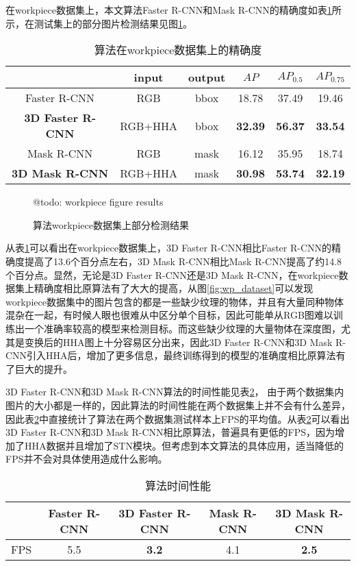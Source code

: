 在workpiece数据集上，本文算法Faster R-CNN和Mask R-CNN的精确度如表\ref{tab:ap2}所示，在测试集上的部分图片检测结果见图\ref{fig:wp_res}。
\begin{table}[ht]
  \centering
  \caption{算法在workpiece数据集上的精确度}
    \begin{tabular}{cccccc}
      \toprule
      &input&output&$AP$&$AP_{0.5}$&$AP_{0.75}$ \\
      \midrule
      Faster R-CNN&RGB&bbox&18.78&37.49&19.46 \\
      \bf{3D Faster R-CNN}&RGB+HHA&bbox&\bf{32.39}&\bf{56.37}&\bf{33.54} \\
      Mask R-CNN&RGB&mask&16.12&35.95&18.74 \\
      \bf{3D Mask R-CNN}&RGB+HHA&mask&\bf{30.98}&\bf{53.74}&\bf{32.19} \\
      \bottomrule
    \end{tabular}
  \label{tab:ap2}
\end{table}
\begin{figure}[ht]
  \centering
  @todo: workpiece figure results
  \caption{算法workpiece数据集上部分检测结果}
  \label{fig:wp_res}
\end{figure}
从表\ref{tab:ap2}可以看出在workpiece数据集上，3D Faster R-CNN相比Faster R-CNN的精确度提高了13.6个百分点左右，3D Mask R-CNN相比Mask R-CNN提高了约14.8个百分点。显然，无论是3D Faster R-CNN还是3D Mask R-CNN，在workpiece数据集上精确度相比原算法有了大大的提高，从图\ref{fig:wp_dataset}可以发现workpiece数据集中的图片包含的都是一些缺少纹理的物体，并且有大量同种物体混杂在一起，有时候人眼也很难从中区分单个目标，因此可能单从RGB图难以训练出一个准确率较高的模型来检测目标。而这些缺少纹理的大量物体在深度图，尤其是变换后的HHA图上十分容易区分出来，因此3D Faster R-CNN和3D Mask R-CNN引入HHA后，增加了更多信息，最终训练得到的模型的准确度相比原算法有了巨大的提升。

3D Faster R-CNN和3D Mask R-CNN算法的时间性能见表\ref{tab:fps}，
由于两个数据集内图片的大小都是一样的，因此算法的时间性能在两个数据集上并不会有什么差异，因此表\ref{tab:fps}中直接统计了算法在两个数据集测试样本上FPS的平均值。从表\ref{tab:fps}可以看出3D Faster R-CNN和3D Mask R-CNN相比原算法，普遍具有更低的FPS，因为增加了HHA数据并且增加了STN模块。但考虑到本文算法的具体应用，适当降低的FPS并不会对具体使用造成什么影响。
\begin{table}[ht]
  \centering
  \begin{tabular}{ccccc}
    \toprule
    &Faster R-CNN&\bf{3D Faster R-CNN}&Mask R-CNN&\bf{3D Mask R-CNN} \\
    \midrule
    FPS&5.5&\bf{3.2}&4.1&\bf{2.5} \\
    \bottomrule
  \end{tabular}
  \caption{算法时间性能}
  \label{tab:fps}
\end{table}


